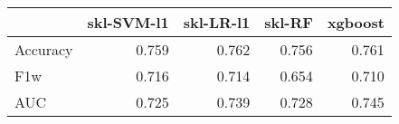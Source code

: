 \begin{tabular}{lrrrr}
\toprule
{} &  skl-SVM-l1 &  skl-LR-l1 &  skl-RF &  xgboost \\
\midrule
Accuracy &       0.759 &      0.762 &   0.756 &    0.761 \\
F1w      &       0.716 &      0.714 &   0.654 &    0.710 \\
AUC      &       0.725 &      0.739 &   0.728 &    0.745 \\
\bottomrule
\end{tabular}
